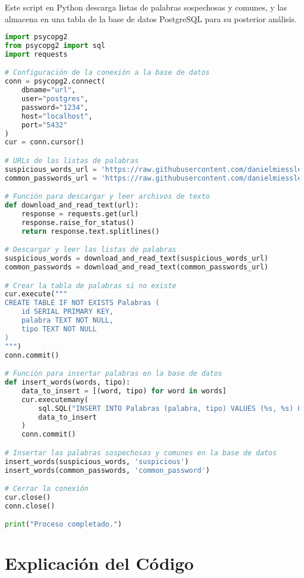 Este script en Python descarga listas de palabras sospechosas y comunes, y las almacena en una tabla de la base de datos PostgreSQL para su posterior análisis.

\begin{lstlisting}[language=Python, caption=Script para crear y poblar la tabla de palabras sospechosas y comunes]
import psycopg2
from psycopg2 import sql
import requests

# Configuración de la conexión a la base de datos
conn = psycopg2.connect(
    dbname="url",
    user="postgres",
    password="1234",
    host="localhost",
    port="5432"
)
cur = conn.cursor()

# URLs de las listas de palabras
suspicious_words_url = 'https://raw.githubusercontent.com/danielmiessler/SecLists/master/Discovery/Web-Content/raft-large-words.txt'
common_passwords_url = 'https://raw.githubusercontent.com/danielmiessler/SecLists/master/Passwords/Common-Credentials/10k-most-common.txt'

# Función para descargar y leer archivos de texto
def download_and_read_text(url):
    response = requests.get(url)
    response.raise_for_status()
    return response.text.splitlines()

# Descargar y leer las listas de palabras
suspicious_words = download_and_read_text(suspicious_words_url)
common_passwords = download_and_read_text(common_passwords_url)

# Crear la tabla de palabras si no existe
cur.execute("""
CREATE TABLE IF NOT EXISTS Palabras (
    id SERIAL PRIMARY KEY,
    palabra TEXT NOT NULL,
    tipo TEXT NOT NULL
)
""")
conn.commit()

# Función para insertar palabras en la base de datos
def insert_words(words, tipo):
    data_to_insert = [(word, tipo) for word in words]
    cur.executemany(
        sql.SQL("INSERT INTO Palabras (palabra, tipo) VALUES (%s, %s) ON CONFLICT DO NOTHING"),
        data_to_insert
    )
    conn.commit()

# Insertar las palabras sospechosas y comunes en la base de datos
insert_words(suspicious_words, 'suspicious')
insert_words(common_passwords, 'common_password')

# Cerrar la conexión
cur.close()
conn.close()

print("Proceso completado.")
\end{lstlisting}

\section*{Explicación del Código}

